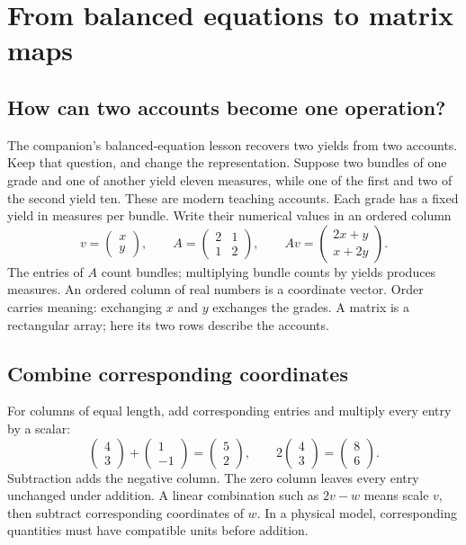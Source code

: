 \chapter{From balanced equations to matrix maps}
\label{learn:matrix_maps}


\section{How can two accounts become one operation?}
The companion's balanced-equation lesson recovers two yields from two
accounts. Keep that question, and change the representation. Suppose two
bundles of one grade and one of another yield eleven measures, while one
of the first and two of the second yield ten. These are modern teaching
accounts. Each grade has a fixed yield in measures per bundle.
Write their numerical values in an ordered column
\[
 v=\begin{pmatrix}x\\y\end{pmatrix},\qquad
 A=\begin{pmatrix}2&1\\1&2\end{pmatrix},\qquad
 Av=\begin{pmatrix}2x+y\\x+2y\end{pmatrix}.
\]
The entries of $A$ count bundles; multiplying bundle counts by yields
produces measures. An ordered column of real numbers is a coordinate
vector. Order carries meaning: exchanging $x$ and $y$ exchanges the grades.
A matrix is a rectangular array; here its two rows describe the accounts.

\section{Combine corresponding coordinates}
For columns of equal length, add corresponding entries and multiply every
entry by a scalar:
\[
 \begin{pmatrix}4\\3\end{pmatrix}+\begin{pmatrix}1\\-1\end{pmatrix}
 =\begin{pmatrix}5\\2\end{pmatrix},\qquad
 2\begin{pmatrix}4\\3\end{pmatrix}=\begin{pmatrix}8\\6\end{pmatrix}.
\]
Subtraction adds the negative column. The zero column leaves every entry
unchanged under addition. A linear combination such as $2v-w$ means scale
$v$, then subtract corresponding coordinates of $w$. In a physical model,
corresponding quantities must have compatible units before addition.

